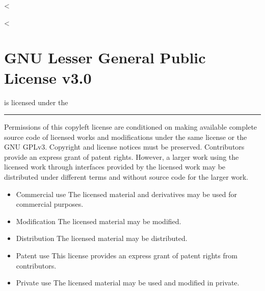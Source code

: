 \documentclass[letterpaper,10pt,english]{sphinxmanual}
\begin{document}
<%
\sphinxstepscope

<%
\chapter{GNU Lesser General Public License v3.0}
\label{\detokenize{examples/lgpl-3.0:gnu-lesser-general-public-license-v3-0}}\label{\detokenize{examples/lgpl-3.0::doc}}
 is licensed under the 



\bigskip\hrule\bigskip



Permissions of this copyleft license are conditioned on making available complete source code of licensed works and modifications under the same license or the GNU GPLv3. Copyright and license notices must be preserved. Contributors provide an express grant of patent rights. However, a larger work using the licensed work through interfaces provided by the licensed work may be distributed under different terms and without source code for the larger work.

\vspace{10px}

\begin{itemize}
\item {}
Commercial use \textendash{} The licensed material and derivatives may be used for commercial purposes.

\item {}
Modification \textendash{} The licensed material may be modified.

\item {}
Distribution \textendash{} The licensed material may be distributed.

\item {}
Patent use \textendash{} This license provides an express grant of patent rights from contributors.

\item {}
Private use \textendash{} The licensed material may be used and modified in private.

\end{itemize}

\vspace{10px}
\end{document}

